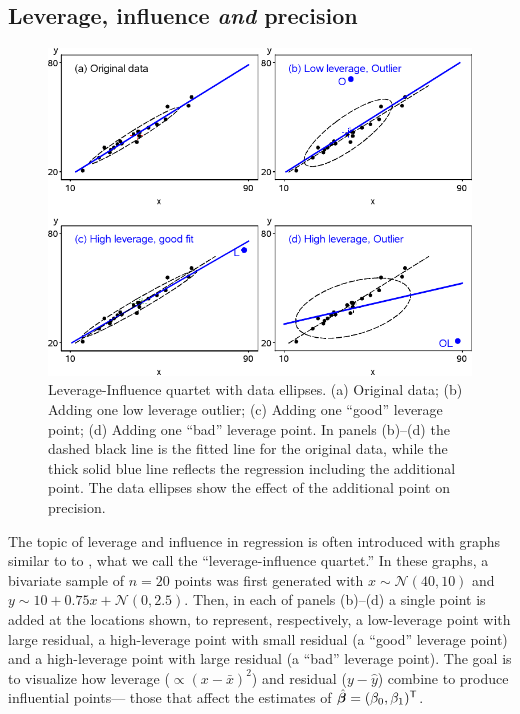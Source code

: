 \subsection{Leverage, influence \emph{and} precision}

\begin{figure}[htb!]
  \centering
  \includegraphics[width=\textwidth,clip]{fig/levdemo21}
  \caption{Leverage-Influence quartet with data ellipses. (a) Original data;
  (b) Adding one low leverage outlier; (c) Adding one ``good'' leverage point;
  (d) Adding one ``bad'' leverage point.
  In panels (b)--(d) the dashed black line is the fitted line for the original
  data, while the thick solid blue line reflects the  regression including the additional point. 
  The data ellipses show the effect of the additional point on precision.}%
  \label{fig:levdemo21}
\end{figure}

The topic of leverage and influence in regression is often introduced with graphs
similar to to , what we call
the ``leverage-influence quartet.''
In these graphs, a bivariate sample of $n=20$ points was first generated
with $x \sim \mathcal{N}(40, 10)$ and $y \sim10 +  0.75 x + \mathcal{N}(0, 2.5)$.
Then, in each of
panels (b)--(d) a single point is added at the locations shown, to represent, respectively,
a low-leverage point with large residual, a high-leverage point with small residual
(a ``good'' leverage point) and a high-leverage point with large residual
(a ``bad'' leverage point).  The goal is to visualize how leverage ($\propto (x-\bar{x})^2$) and 
residual ($y - \hat{y}$) combine to produce influential points--- those that affect
the estimates of $\hat{\bm{\beta}} = (\beta_0 , \beta_1)^\mathsf{T}$.


